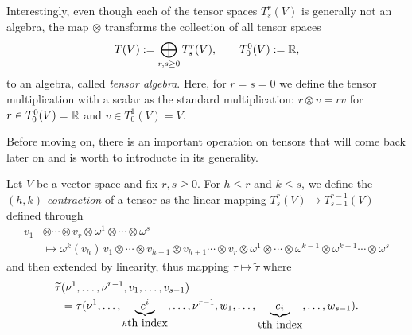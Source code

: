 \begin{remark}
  Interestingly, even though each of the tensor spaces $T_s^r(V)$ is generally not an algebra, the map $\otimes$ transforms the collection of all tensor spaces
  \begin{equation}
    T(V) := \bigoplus_{r,s\geq 0} T_s^r(V), \qquad T_0^0(V):= \mathbb{R},
  \end{equation}
  to an algebra, called \emph{tensor algebra}.
  Here, for $r=s=0$ we define the tensor multiplication with a scalar as the standard multiplication: $r\otimes v = r v$ for $r\in T_0^0(V)=\mathbb{R}$ and $v\in T^1_0(V)=V$.
\end{remark}

Before moving on, there is an important operation on tensors that will come back later on and is worth to introducte in its generality.

\begin{definition}
  Let $V$ be a vector space and fix $r,s\geq0$.
  For $h\leq r$ and $k\leq s$, we define the \emph{$(h,k)$-contraction} of a tensor as the linear mapping $T_s^r(V)\to T_{s-1}^{r-1}(V)$ defined through
  \begin{align}
    v_1 & \otimes\cdots\otimes v_r\otimes\omega^1\otimes\cdots\otimes\omega^s                                                                                                            \\
        & \mapsto \omega^k(v_h)\, v_1\otimes\cdots\otimes v_{h-1}\otimes v_{h+1}\cdots\otimes v_r\otimes\omega^1\otimes\cdots\otimes\omega^{k-1}\otimes\omega^{k+1}\cdots\otimes\omega^s
  \end{align}
  and then extended by linearity, thus mapping $\tau \mapsto \widetilde\tau$ where
  \begin{align}
    \widetilde\tau & (\nu^1,\ldots,\nu^{r-1}, v_1,\ldots,v_{s-1})                                                                                                       \\
                   & = \tau(\nu^1,\ldots,\LaTeXunderbrace{e^i}_{h\mbox{th index}},\ldots,\nu^{r-1},w_1,\ldots,\LaTeXunderbrace{e_i}_{k\mbox{th index}},\ldots,w_{s-1}).
  \end{align}
\end{definition}

